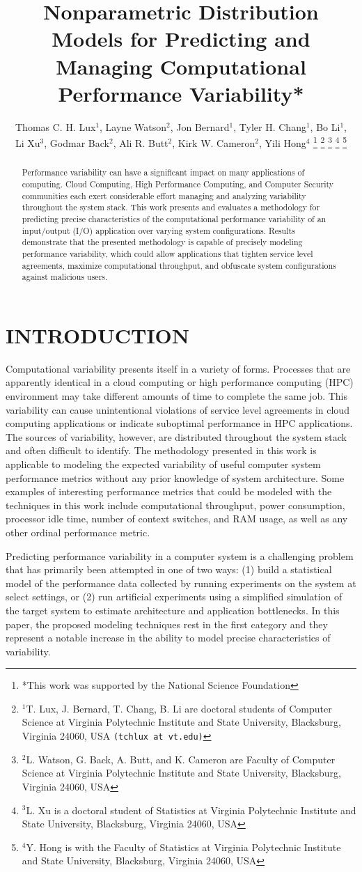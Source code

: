 \documentclass[letterpaper, 10 pt, conference]{ieeeconf}  %
\title{\LARGE \bf Nonparametric Distribution Models for Predicting and
  \\ Managing Computational Performance Variability* }
\author{Thomas C. H. Lux$^{1}$, Layne Watson$^{2}$, Jon Bernard$^{1}$, Tyler H. Chang$^{1}$, Bo Li$^{1}$, \\ Li Xu$^{3}$, Godmar Back$^{2}$, Ali R. Butt$^{2}$, Kirk W. Cameron$^{2}$, Yili Hong$^{4}$%
\thanks{*This work was supported by the National Science Foundation}%
\thanks{$^{1}$T. Lux, J. Bernard, T. Chang, B. Li are doctoral students of Computer Science at Virginia Polytechnic Institute and State University, Blacksburg, Virginia 24060, USA {\tt\small (tchlux at vt.edu)}}%
\thanks{$^{2}$L. Watson, G. Back, A. Butt, and K. Cameron are Faculty of Computer Science at Virginia Polytechnic Institute and State University, Blacksburg, Virginia 24060, USA}%
\thanks{$^{3}$L. Xu is a doctoral student of Statistics at Virginia Polytechnic Institute and State University, Blacksburg, Virginia 24060, USA}%
\thanks{$^{4}$Y. Hong is with the Faculty of Statistics at Virginia Polytechnic Institute and State University, Blacksburg, Virginia 24060, USA}%
}
\begin{document}
\maketitle
\thispagestyle{empty}
\pagestyle{empty}

\begin{abstract}
Performance variability can have a significant impact on many applications of computing. Cloud Computing, High Performance Computing, and Computer Security communities each exert considerable effort managing and analyzing variability throughout the system stack. This work presents and evaluates a methodology for predicting precise characteristics of the computational performance variability of an input/output (I/O) application over varying system configurations. Results demonstrate that the presented methodology is capable of precisely modeling performance variability, which could allow applications that tighten service level agreements, maximize computational throughput, and obfuscate system configurations against malicious users.
\end{abstract}

\section{INTRODUCTION}
\label{sec:introduction}

Computational variability presents itself in a variety of forms. Processes that are apparently identical in a cloud computing or high performance computing (HPC) environment may take different amounts of time to complete the same job. This variability can cause unintentional violations of service level agreements in cloud computing applications or indicate suboptimal performance in HPC applications. The sources of variability, however, are distributed throughout the system stack and often difficult to identify. The methodology presented in this work is applicable to modeling the expected variability of useful computer system performance metrics without any prior knowledge of system architecture. Some examples of interesting performance metrics that could be modeled with the techniques in this work include computational throughput, power consumption, processor idle time, number of context switches, and RAM usage, as well as any other ordinal performance metric.

Predicting performance variability in a computer system is a challenging problem that has primarily been attempted in one of two ways: (1) build a statistical model of the performance data collected by running experiments on the system at select settings, or (2) run artificial experiments using a simplified simulation of the target system to estimate architecture and application bottlenecks. In this paper, the proposed modeling techniques rest in the first category and they represent a notable increase in the ability to model precise characteristics of variability.
\end{document}
